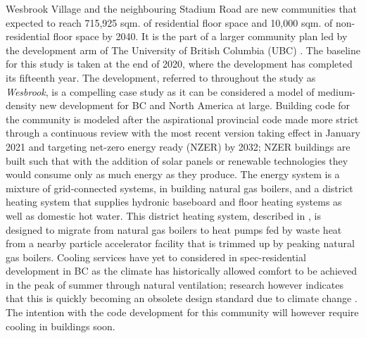 \documentclass[twocolumn, a4paper,10pt]{article}
\begin{document}
Wesbrook Village and the neighbouring Stadium Road are new communities that expected to reach 715,925 sqm. of residential floor space and 10,000 sqm. of non-residential floor space by 2040. It is the part of a larger community plan led by the development arm of The University of British Columbia (UBC) \citep{wesbrook plan; stadium plan}. The baseline for this study is taken at the end of 2020, where the development has completed its fifteenth year. The development, referred to throughout the study as \textit{Wesbrook}, is a compelling case study as it can be considered a model of medium-density new development for BC and North America at large. Building code for the community is modeled after the aspirational provincial code made more strict through a continuous review with the most recent version taking effect in January 2021 and targeting net-zero energy ready (NZER) by 2032; NZER buildings are built such that with the addition of solar panels or renewable technologies they would consume only as much energy as they produce. The energy system is a mixture of grid-connected systems, in building natural gas boilers, and a district heating system that supplies hydronic baseboard and floor heating systems as well as domestic hot water. This district heating system, described in \citet{McCarty 2021}, is designed to migrate from natural gas boilers to heat pumps fed by waste heat from a nearby particle accelerator facility that is trimmed up by peaking natural gas boilers. Cooling services have yet to considered in spec-residential development in BC as the climate has historically allowed comfort to be achieved in the peak of summer through natural ventilation; research however indicates that this is quickly becoming an obsolete design standard due to climate change \citep{ML cooling paper}. The intention with the code development for this community will however require cooling in buildings soon.  
\end{document}
